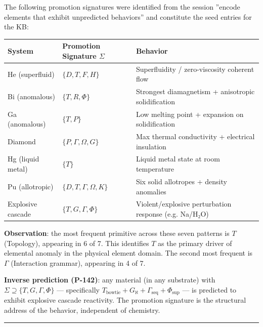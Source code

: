\documentclass[12pt,a4paper]{article}
\begin{document}
The following promotion signatures were identified from the session ''encode elements that exhibit unpredicted behaviors'' and constitute the seed entries for the KB:

\begin{table}[htbp]
\centering
\small
{}
\begin{tabularx}{\textwidth}{>{\centering\arraybackslash}X >{\centering\arraybackslash}X >{\centering\arraybackslash}X}
\toprule
\rowcolor{gray!25}\textbf{System} & \textbf{Promotion Signature $\Sigma$} & \textbf{Behavior} \\
\midrule
\rowcolors{1}{white}{gray!10}
He (superfluid) & $\{D, T, F, H\}$ & Superfluidity / zero-viscosity coherent flow \\
Bi (anomalous) & $\{T, R, \Phi\}$ & Strongest diamagnetism + anisotropic solidification \\
Ga (anomalous) & $\{T, P\}$ & Low melting point + expansion on solidification \\
Diamond & $\{P, \Gamma, \Omega, G\}$ & Max thermal conductivity + electrical insulation \\
Hg (liquid metal) & $\{T\}$ & Liquid metal state at room temperature \\
Pu (allotropic) & $\{D, T, \Gamma, \Omega, K\}$ & Six solid allotropes + density anomalies \\
Explosive cascade & $\{T, G, \Gamma, \Phi\}$ & Violent/explosive perturbation response (e.g. Na/H₂O) \\
\bottomrule
\end{tabularx}
\end{table}

\textbf{Observation}: the most frequent primitive across these seven patterns is $T$ (Topology), appearing in 6 of 7. This identifies $T$ as the primary driver of elemental anomaly in the physical element domain. The second most frequent is $\Gamma$ (Interaction grammar), appearing in 4 of 7.

\textbf{Inverse prediction (P-142)}: any material (in any substrate) with $\Sigma \supseteq \{T, G, \Gamma, \Phi\}$ --- specifically $T_\text{bowtie} + G_{\aleph} + \Gamma_\text{seq} + \Phi_\text{sup}$ --- is predicted to exhibit explosive cascade reactivity. The promotion signature is the structural address of the behavior, independent of chemistry.

\begin{center}
\rule{0.5\textwidth}{0.4pt}
\end{center}
\end{document}
